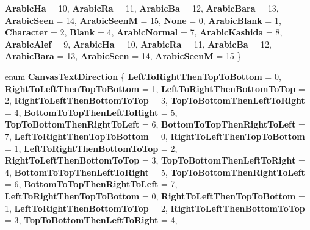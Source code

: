 \begin{DoxyCompactItemize}
{\bfseries Arabic\+Ha} = 10, 
{\bfseries Arabic\+Ra} = 11, 
\newline
{\bfseries Arabic\+Ba} = 12, 
{\bfseries Arabic\+Bara} = 13, 
{\bfseries Arabic\+Seen} = 14, 
{\bfseries Arabic\+SeenM} = 15, 
\newline
{\bfseries None} = 0, 
{\bfseries Arabic\+Blank} = 1, 
{\bfseries Character} = 2, 
{\bfseries Blank} = 4, 
\newline
{\bfseries Arabic\+Normal} = 7, 
{\bfseries Arabic\+Kashida} = 8, 
{\bfseries Arabic\+Alef} = 9, 
{\bfseries Arabic\+Ha} = 10, 
\newline
{\bfseries Arabic\+Ra} = 11, 
{\bfseries Arabic\+Ba} = 12, 
{\bfseries Arabic\+Bara} = 13, 
{\bfseries Arabic\+Seen} = 14, 
\newline
{\bfseries Arabic\+SeenM} = 15
 \}
\item 
\mbox{\label{namespace_microsoft_1_1_graphics_1_1_canvas_1_1_text_a1e2efbc072261f0f4a89ae31e85b3d2a}} 
enum {\bfseries Canvas\+Text\+Direction} \{ \newline
{\bfseries Left\+To\+Right\+Then\+Top\+To\+Bottom} = 0, 
{\bfseries Right\+To\+Left\+Then\+Top\+To\+Bottom} = 1, 
{\bfseries Left\+To\+Right\+Then\+Bottom\+To\+Top} = 2, 
{\bfseries Right\+To\+Left\+Then\+Bottom\+To\+Top} = 3, 
\newline
{\bfseries Top\+To\+Bottom\+Then\+Left\+To\+Right} = 4, 
{\bfseries Bottom\+To\+Top\+Then\+Left\+To\+Right} = 5, 
{\bfseries Top\+To\+Bottom\+Then\+Right\+To\+Left} = 6, 
{\bfseries Bottom\+To\+Top\+Then\+Right\+To\+Left} = 7, 
\newline
{\bfseries Left\+To\+Right\+Then\+Top\+To\+Bottom} = 0, 
{\bfseries Right\+To\+Left\+Then\+Top\+To\+Bottom} = 1, 
{\bfseries Left\+To\+Right\+Then\+Bottom\+To\+Top} = 2, 
{\bfseries Right\+To\+Left\+Then\+Bottom\+To\+Top} = 3, 
\newline
{\bfseries Top\+To\+Bottom\+Then\+Left\+To\+Right} = 4, 
{\bfseries Bottom\+To\+Top\+Then\+Left\+To\+Right} = 5, 
{\bfseries Top\+To\+Bottom\+Then\+Right\+To\+Left} = 6, 
{\bfseries Bottom\+To\+Top\+Then\+Right\+To\+Left} = 7, 
\newline
{\bfseries Left\+To\+Right\+Then\+Top\+To\+Bottom} = 0, 
{\bfseries Right\+To\+Left\+Then\+Top\+To\+Bottom} = 1, 
{\bfseries Left\+To\+Right\+Then\+Bottom\+To\+Top} = 2, 
{\bfseries Right\+To\+Left\+Then\+Bottom\+To\+Top} = 3, 
\newline
{\bfseries Top\+To\+Bottom\+Then\+Left\+To\+Right} = 4, 

\end{DoxyCompactItemize}
